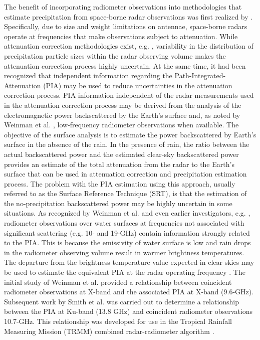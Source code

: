 \documentclass[10pt]{ietbook}
\begin{document}
The benefit of incorporating radiometer observations into methodologies that estimate precipitation from
space-borne radar observations was first realized by \cite{weinman90}. Specifically, due to size and weight limitations on antennae, space-borne radars 
operate at frequencies that make observations subject to attenuation. While
attenuation correction methodologies exist, e.g. \cite{hitschfeld1954}, variability in the distribution of
precipitation particle sizes within the radar observing volume makes the attenuation correction process highly uncertain.
At the same time, it had been recognized \cite{Meneghini1983} that independent information regarding the Path-Integrated-Attenuation (PIA) 
may be used to reduce uncertainties in the attenuation correction process. PIA information
independent of the radar measurements used in the attenuation correction process may be derived from the analysis
of the electromagnetic power backscattered by the Earth's surface \cite{Meneghini1983} and, as noted by Weinman et al. \cite{weinman90}, 
low-frequency radiometer observations when available.  The objective of the surface analysis is to estimate the power backscattered by Earth's surface in the 
absence of the rain.  In the presence of rain, the ratio between the actual backscattered power and the estimated clear-sky backscattered power provides an estimate
of the total attenuation from the radar to the Earth's surface \cite{Meneghini1983} that can be used in attenuation correction and precipitation estimation process. 
The problem with the PIA estimation using this approach, usually referred to as the Surface Reference Technique (SRT), is that the estimation of the no-precipitation 
backscattered power may be highly uncertain in some situations.  As recognized by Weinman et al. \cite{weinman90} and even earlier investigators, e.g. \cite{Fujita1985},
radiometer observations over water surfaces at frequencies not associated with significant scattering (e.g. 10- and 19-GHz) contain information strongly related to the PIA.  
This is because the emissivity of water surface is low and rain drops in the radiometer observing volume result in warmer brightness temperatures.  The departure from the
brightness temperature value expected in clear skies may be used to estimate the equivalent PIA at the radar operating frequency \cite{weinman90}.  The initial study of
Weinman et al. \cite{weinman90} provided a relationship between coincident radiometer observations at X-band and the associated PIA at X-band (9.6-GHz). Subsequent work 
by Smith et al. \cite{smith1997} was carried out to determine a relationship between the PIA at Ku-band (13.8 GHz) and coincident radiometer observations 10.7-GHz. 
This relationship was developed for use in the Tropical Rainfall Measuring Mission (TRMM) \cite{kummerow1998} combined radar-radiometer algorithm \cite{haddad1997}.
\end{document}

